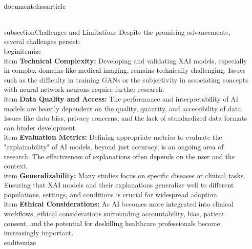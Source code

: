 \\documentclass{article}
\begin{document}
\\subsection{Challenges and Limitations}
Despite the promising advancements, several challenges persist:
\\begin{itemize}
    \\item \textbf{Technical Complexity:} Developing and validating XAI models, especially in complex domains like medical imaging, remains technically challenging. Issues such as the difficulty in training GANs or the subjectivity in associating concepts with neural network neurons require further research.
    \\item \textbf{Data Quality and Access:} The performance and interpretability of AI models are heavily dependent on the quality, quantity, and accessibility of data. Issues like data bias, privacy concerns, and the lack of standardized data formats can hinder development.
    \\item \textbf{Evaluation Metrics:} Defining appropriate metrics to evaluate the "explainability" of AI models, beyond just accuracy, is an ongoing area of research. The effectiveness of explanations often depends on the user and the context.
    \\item \textbf{Generalizability:} Many studies focus on specific diseases or clinical tasks. Ensuring that XAI models and their explanations generalize well to different populations, settings, and conditions is crucial for widespread adoption.
    \\item \textbf{Ethical Considerations:} As AI becomes more integrated into clinical workflows, ethical considerations surrounding accountability, bias, patient consent, and the potential for deskilling healthcare professionals become increasingly important.
\\end{itemize}
\end{document}

